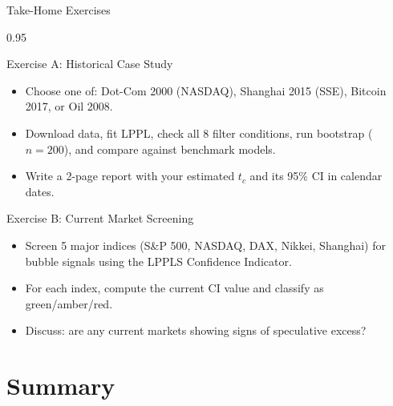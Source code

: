 \documentclass[9pt, aspectratio=169, t]{beamer}
\begin{document}
\begin{frame}{Take-Home Exercises}
    \begin{cminipage}{0.95\textwidth}
    {\small
    \begin{block}{Exercise A: Historical Case Study}
        \begin{itemize}\setlength{\itemsep}{2pt}
            \item Choose one of: Dot-Com 2000 (NASDAQ), Shanghai 2015 (SSE), Bitcoin 2017, or Oil 2008.
            \item Download data, fit LPPL, check all 8 filter conditions, run bootstrap ($n = 200$), and compare against benchmark models.
            \item Write a 2-page report with your estimated $t_c$ and its 95\% CI in calendar dates.
        \end{itemize}
    \end{block}

    \vspace{-1mm}

    \begin{exampleblock}{Exercise B: Current Market Screening}
        \begin{itemize}\setlength{\itemsep}{2pt}
            \item Screen 5 major indices (S\&P 500, NASDAQ, DAX, Nikkei, Shanghai) for bubble signals using the LPPLS Confidence Indicator.
            \item For each index, compute the current CI value and classify as green/amber/red.
            \item Discuss: are any current markets showing signs of speculative excess?
        \end{itemize}
    \end{exampleblock}
    }
    \end{cminipage}
\end{frame}

\section{Summary}
\end{document}
